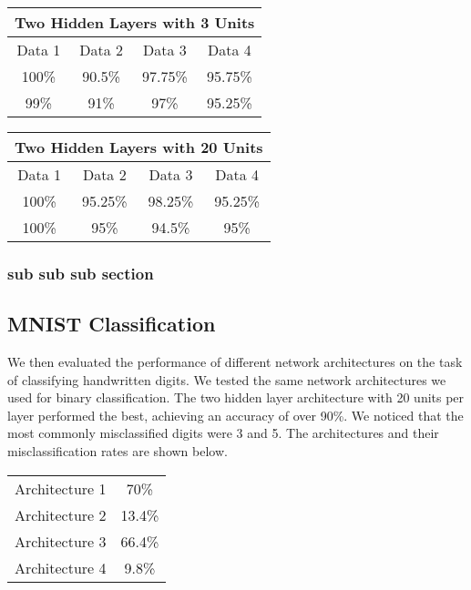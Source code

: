 \documentclass[10pt,twoside]{article}
\begin{document}
\begin{center}
 \begin{tabular}{||c c c c||} 
 \hline
 \multicolumn{4}{|c|}{Two Hidden Layers with 3 Units} \\
 \hline
 \hline
 Data 1 & Data 2 & Data 3 & Data 4 \\ [0.5ex] 
  \hline
 100\% & 90.5\% & 97.75\% & 95.75\% \\
 \hline\hline
 99\% & 91\% & 97\% & 95.25\% \\ 

 \hline
\end{tabular}
\end{center}

\begin{center}
 \begin{tabular}{||c c c c||} 
 \hline
 \multicolumn{4}{|c|}{Two Hidden Layers with 20 Units} \\
 \hline
 \hline
 Data 1 & Data 2 & Data 3 & Data 4 \\ [0.5ex] 
  \hline
 100\% & 95.25\% & 98.25\% & 95.25\% \\
 \hline\hline
 100\% & 95\% & 94.5\% & 95\% \\ 

 \hline
\end{tabular}
\end{center}
\subsubsection{sub sub sub section}


\subsection{MNIST Classification}

We then evaluated the performance of different network architectures on the task of classifying handwritten digits. We tested the same network architectures we used for binary classification. The two hidden layer architecture with 20 units per layer performed the best, achieving an accuracy of over 90\%. We noticed that the most commonly misclassified digits were 3 and 5. The architectures and their misclassification rates are shown below. 

\begin{center}
\begin{tabular}{ |c|c| } 
 \hline
 Architecture 1 & 70\% \\ 
 Architecture 2 & 13.4\% \\ 
 Architecture 3 & 66.4\% \\ 
 Architecture 4 & 9.8\% \\ 
 \hline
\end{tabular}
\end{center} 
\end{document}
